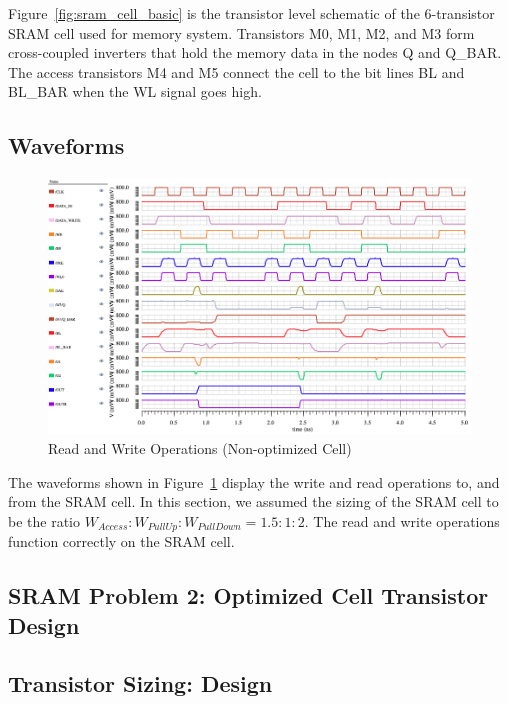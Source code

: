 \documentclass[10pt,letterpaper,onecolumn]{article}
\begin{document}
Figure~\ref{fig:sram_cell_basic} is the transistor level schematic of the 6-transistor SRAM cell used for memory system. Transistors M0, M1, M2, and M3 form cross-coupled inverters that hold the memory data in the nodes Q and Q\_BAR. The access transistors M4 and M5 connect the cell to the bit lines BL and BL\_BAR when the WL signal goes high.

\subsection{Waveforms}
\begin{figure}[h!]
\centering
\includegraphics[clip,width=\columnwidth]{Problem1-TestRead-Write.png}
\caption{Read and Write Operations (Non-optimized Cell)}
\label{fig:Test_Read-Write}
\end{figure}

The waveforms shown in Figure~\ref{fig:Test_Read-Write} display the write and read operations to, and from the SRAM cell. In this section, we assumed the sizing of the SRAM cell to be the ratio $W_{Access}:W_{PullUp}:W_{PullDown} = 1.5:1:2$. The read and write operations function correctly on the SRAM cell.

\clearpage
\begin{center}
\section{SRAM Problem 2: Optimized Cell Transistor Design}
\end{center}

\subsection{Transistor Sizing: Design}
\end{document}

